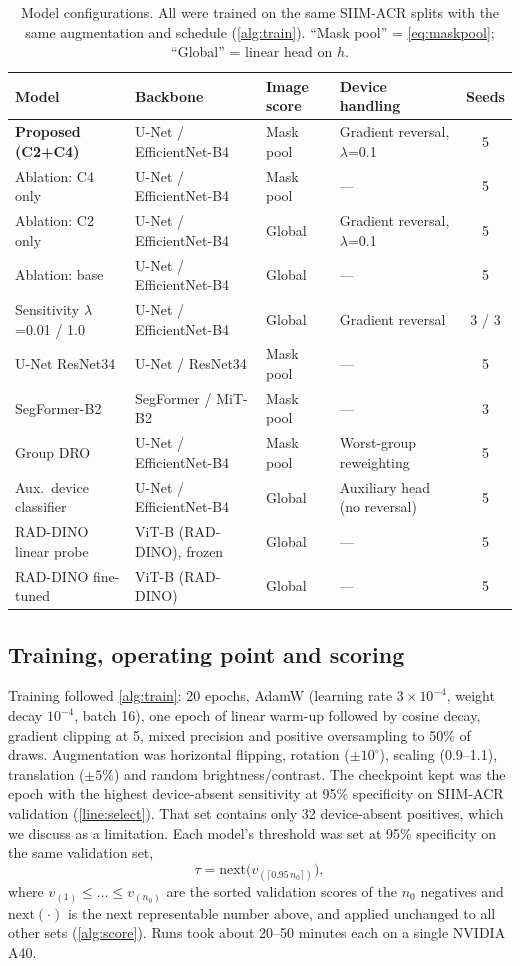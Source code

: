 \documentclass{ieeeaccess}
\begin{document}
\begin{table}[!t]
\centering\small
\caption{Model configurations. All were trained on the same SIIM-ACR splits with the same augmentation and schedule (\cref{alg:train}). ``Mask pool'' = \cref{eq:maskpool}; ``Global'' = linear head on $h$.}
\label{tab:models}
\begin{tabular}{@{}l l l l c@{}}
\toprule
Model & Backbone & Image score & Device handling & Seeds \\
\midrule
\textbf{Proposed (C2+C4)} & U-Net / EfficientNet-B4 & Mask pool & Gradient reversal, $\lambda$=0.1 & 5 \\
Ablation: C4 only & U-Net / EfficientNet-B4 & Mask pool & --- & 5 \\
Ablation: C2 only & U-Net / EfficientNet-B4 & Global & Gradient reversal, $\lambda$=0.1 & 5 \\
Ablation: base & U-Net / EfficientNet-B4 & Global & --- & 5 \\
Sensitivity $\lambda$=0.01 / 1.0 & U-Net / EfficientNet-B4 & Global & Gradient reversal & 3 / 3 \\
U-Net ResNet34 & U-Net / ResNet34 & Mask pool & --- & 5 \\
SegFormer-B2 & SegFormer / MiT-B2 & Mask pool & --- & 3 \\
Group DRO & U-Net / EfficientNet-B4 & Mask pool & Worst-group reweighting & 5 \\
Aux.\ device classifier & U-Net / EfficientNet-B4 & Global & Auxiliary head (no reversal) & 5 \\
RAD-DINO linear probe & ViT-B (RAD-DINO), frozen & Global & --- & 5 \\
RAD-DINO fine-tuned & ViT-B (RAD-DINO) & Global & --- & 5 \\
\bottomrule
\end{tabular}
\end{table}

\subsection{Training, operating point and scoring}
\label{sec:training}
Training followed \cref{alg:train}: 20 epochs, AdamW (learning rate $3\times10^{-4}$, weight decay $10^{-4}$, batch 16), one epoch of linear warm-up followed by cosine decay, gradient clipping at 5, mixed precision and positive oversampling to 50\% of draws. Augmentation was horizontal flipping, rotation ($\pm10^\circ$), scaling (0.9--1.1), translation ($\pm5\%$) and random brightness/contrast. The checkpoint kept was the epoch with the highest device-absent sensitivity at 95\% specificity on SIIM-ACR validation (\cref{line:select}). That set contains only 32 device-absent positives, which we discuss as a limitation. Each model's threshold was set at 95\% specificity on the same validation set,
\begin{equation}
\tau = \mathrm{next}\big(v_{(\lceil 0.95\,n_0\rceil)}\big),
\label{eq:tau}
\end{equation}
where $v_{(1)}\le\dots\le v_{(n_0)}$ are the sorted validation scores of the $n_0$ negatives and $\mathrm{next}(\cdot)$ is the next representable number above, and applied unchanged to all other sets (\cref{alg:score}). Runs took about 20--50 minutes each on a single NVIDIA A40.
\end{document}

